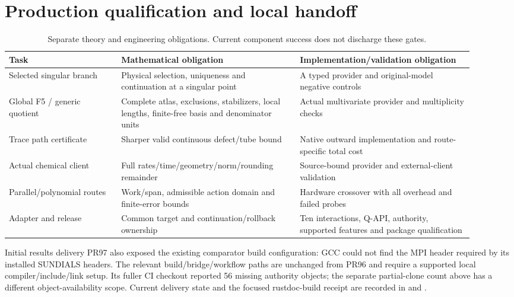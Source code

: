 \documentclass[aps,pra,reprint,onecolumn,10pt,notitlepage,nofootinbib]{revtex4-2}
\begin{document}
\section{Production qualification and local handoff}

\begin{table}[h]
\caption{Separate theory and engineering obligations. Current component
success does not discharge these gates.}
\begin{ruledtabular}
\begin{tabular}{L{0.22\linewidth}L{0.35\linewidth}L{0.34\linewidth}}
Task & Mathematical obligation & Implementation/validation obligation \\
\hline
Selected singular branch & Physical selection, uniqueness and continuation at a singular point & A typed provider and original-model negative controls \\
Global F5 / generic quotient & Complete atlas, exclusions, stabilizers, local lengths, finite-free basis and denominator units & Actual multivariate provider and multiplicity checks \\
Trace path certificate & Sharper valid continuous defect/tube bound & Native outward implementation and route-specific total cost \\
Actual chemical client & Full rates/time/geometry/norm/rounding remainder & Source-bound provider and external-client validation \\
Parallel/polynomial routes & Work/span, admissible action domain and finite-error bounds & Hardware crossover with all overhead and failed probes \\
Adapter and release & Common target and continuation/rollback ownership & Ten interactions, Q-API, authority, supported features and package qualification
\end{tabular}
\end{ruledtabular}
\end{table}

Initial results delivery PR97 also exposed the existing comparator build
configuration: GCC could not find the MPI header required by its installed
SUNDIALS headers. The relevant build/bridge/workflow paths are unchanged
from PR96 and require a supported local compiler/include/link setup. Its
fuller CI checkout reported 56 missing authority objects; the separate
partial-clone count above has a different object-availability scope.
Current delivery state and the focused rustdoc-build receipt are recorded
in  and .
\end{document}
